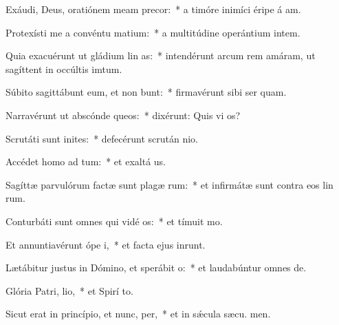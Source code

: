 \item Exáudi, Deus, oratiónem meam  precor:~* a timóre inimíci éripe á am.
\item Protexísti me a convéntu matium:~* a multitúdine operántium intem.
\item Quia exacuérunt ut gládium lin as:~* intendérunt arcum rem amáram, ut sagíttent in occúltis imtum.
\item Súbito sagittábunt eum, et non bunt:~* firmavérunt sibi ser quam.
\item Narravérunt ut abscónde queos:~* dixérunt: Quis vi os?
\item Scrutáti sunt inites:~* defecérunt scrután nio.
\item Accédet homo ad  tum:~* et exaltá us.
\item Sagíttæ parvulórum factæ sunt plagæ rum:~* et infirmátæ sunt contra eos lin rum.
\item Conturbáti sunt omnes qui vidé os:~* et tímuit  mo.
\item Et annuntiavérunt ópe i,~* et facta ejus inrunt.
\item Lætábitur justus in Dómino, et sperábit  o:~* et laudabúntur omnes  de.
\item Glória Patri,  lio,~* et Spirí to.
\item Sicut erat in princípio, et nunc,  per,~* et in sǽcula sæcu. men.
